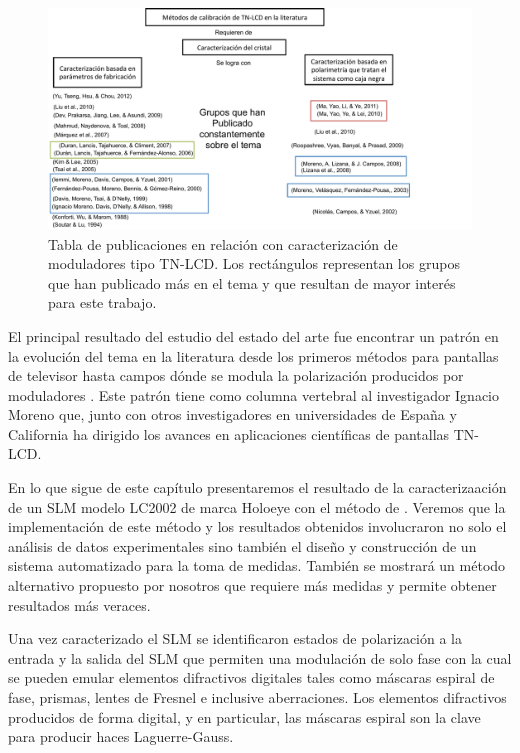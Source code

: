 \begin{figure}[h!]
\centering
\includegraphics[scale=.6]{articulos_metodos}
\caption[Publicaciones en relación a la caracterización de TN-LCD]{Tabla de publicaciones en relación con caracterización de
  moduladores tipo TN-LCD. Los rectángulos representan los grupos que
  han publicado más en el tema y que resultan de mayor interés para
  este trabajo. }
\label{fig:articulos_metodos}
\end{figure}
El principal resultado del estudio del estado del arte fue encontrar
un patrón en la evolución del tema en la literatura desde los primeros
métodos para pantallas de televisor  hasta campos
dónde se modula la polarización producidos por moduladores
. Este patrón tiene como columna vertebral al 
investigador Ignacio Moreno que, junto con otros investigadores en
universidades de España y California ha dirigido los avances en aplicaciones
científicas de pantallas TN-LCD. 

En lo que sigue de este capítulo presentaremos el resultado de la
caracterizaación de un SLM modelo LC2002 de marca Holoeye con el
método de .
Veremos que la implementación de este método y los resultados
obtenidos involucraron no solo el análisis de datos experimentales sino también el diseño y
construcción de un sistema automatizado para la toma de medidas.  
También se mostrará un método alternativo propuesto por nosotros que requiere más medidas
y permite obtener resultados más veraces. 

Una vez caracterizado el SLM se identificaron estados de polarización
a la entrada y la salida del SLM que permiten una modulación de solo
fase con la cual se pueden emular elementos difractivos digitales
tales como máscaras espiral de fase, prismas, lentes de Fresnel e
inclusive aberraciones. Los elementos difractivos producidos de forma 
digital, y en particular, las máscaras espiral 
 son la clave para producir haces Laguerre-Gauss.  

